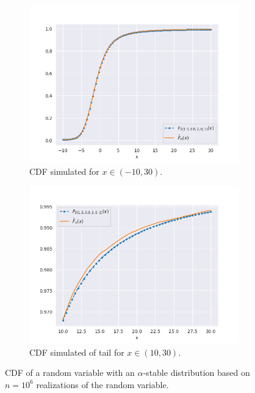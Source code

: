\documentclass{article}
\begin{document}
		\begin{figure}[H]	
			\begin{subfigure}[h]{.5\textwidth}
				\centering
				\includegraphics[width=1\linewidth]{images/stable_CDF.png}
				\caption{CDF simulated for $x \in (-10,30)$.}
			\end{subfigure}
			\begin{subfigure}[r]{.5\textwidth}
				\centering
				\includegraphics[width=1\linewidth]{images/stable_CDF_large_x.png}
				\caption{CDF simulated of tail for $x \in (10,30)$.}
			\end{subfigure}
			\caption{CDF of a random variable with an $\alpha$-stable distribution based on $n=10^6$ realizations of the random variable.}\label{stable_cdf}
		\end{figure}
\end{document}
